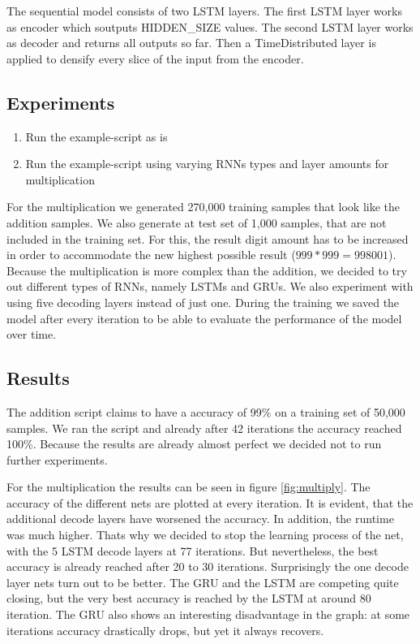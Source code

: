 \documentclass{article}[]
\begin{document}
The sequential model consists of two LSTM layers.
The first LSTM layer works as encoder which soutputs HIDDEN\_SIZE values.
The second LSTM layer works as decoder and returns all outputs so far.
Then a TimeDistributed layer is applied to densify every slice of the input from the encoder.

\subsection{Experiments}

\begin{enumerate}
	\item{Run the example-script as is}
	\item{Run the example-script using varying RNNs types and layer amounts for multiplication}
\end{enumerate}

For the multiplication we generated 270,000 training samples that look like the addition samples.
We also generate at test set of 1,000 samples, that are not included in the training set.
For this, the result digit amount has to be increased in order to accommodate the new highest possible result ($999*999=998001$).
Because the multiplication is more complex than the addition, we decided to try out different types of RNNs, namely LSTMs and GRUs.
We also experiment with using five decoding layers instead of just one.
During the training we saved the model after every iteration to be able to evaluate the performance of the model over time.

\subsection{Results}
The addition script claims to have a accuracy of 99\% on a training set of 50,000 samples.
We ran the script and already after 42 iterations the accuracy reached 100\%.
Because the results are already almost perfect we decided not to run further experiments.


For the multiplication the results can be seen in figure \ref{fig:multiply}.
The accuracy of the different nets are plotted at every iteration.
It is evident, that the additional decode layers have worsened the accuracy.
In addition, the runtime was much higher.
Thats why we decided to stop the learning process of the net, with the 5 LSTM decode layers at 77 iterations.
But nevertheless, the best accuracy is already reached after 20 to 30 iterations.
Surprisingly the one decode layer nets turn out to be better.
The GRU and the LSTM are competing quite closing, but the very best accuracy is reached by the LSTM at around 80 iteration.
The GRU also shows an interesting disadvantage in the graph: at some iterations accuracy drastically drops, but yet it always recovers.
\end{document}
